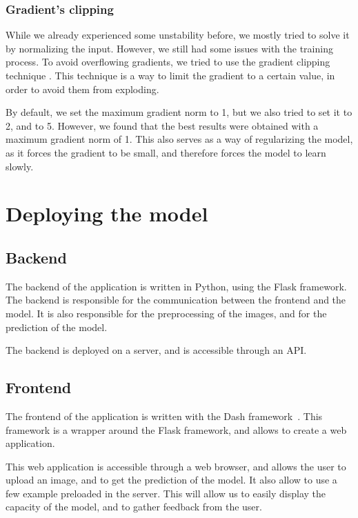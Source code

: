 \documentclass[11pt]{article}
\begin{document}
    \subsubsection{Gradient's clipping}

        While we already experienced some unstability before, we mostly tried to solve it by normalizing the input.
        However, we still had some issues with the training process. To avoid overflowing gradients, we tried to use the gradient clipping technique \cite{gradient_clipping}.
        This technique is a way to limit the gradient to a certain value, in order to avoid them from exploding.

        By default, we set the maximum gradient norm to 1, but we also tried to set it to 2, and to 5. However, we found that the best results were obtained with a maximum gradient norm of 1.
        This also serves as a way of regularizing the model, as it forces the gradient to be small, and therefore forces the model to learn slowly.


    \section{Deploying the model}

        \subsection{Backend}

            The backend of the application is written in Python, using the Flask framework. The backend is responsible for the communication between the frontend and the model.
            It is also responsible for the preprocessing of the images, and for the prediction of the model.

            The backend is deployed on a server, and is accessible through an API.

        \subsection{Frontend}

            The frontend of the application is written with the Dash framework~\cite{dash}. This framework is a wrapper around the Flask framework, and allows to create a web application.

            This web application is accessible through a web browser, and allows the user to upload an image, and to get the prediction of the model. It also allow to use a few example
            preloaded in the server. This will allow us to easily display the capacity of the model, and to gather feedback from the user.
\end{document}
